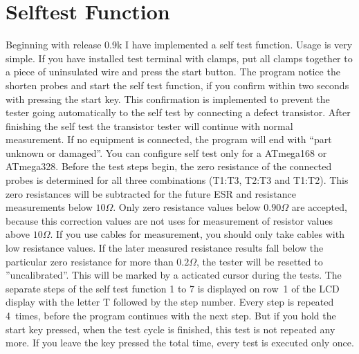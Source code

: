
\section{Selftest Function}
\label{sec:selftest}
Beginning with release 0.9k I have implemented a self test function. Usage is very simple.
If you have installed  test terminal with clamps, put all clamps together to a piece of uninsulated wire and press the start button.
The program notice the shorten probes and start the self test function, if you confirm within two
seconds with pressing the start key. This confirmation is implemented to prevent the tester
going automatically to the self test by connecting a defect transistor.
After finishing the self test the transistor tester will continue with normal measurement.
If no equipment is connected, the program will end with ``part unknown or damaged''. 
You can configure self test only for a ATmega168  or ATmega328.
Before the test steps begin, the zero resistance of the connected probes is determined for all three combinations
(T1:T3, T2:T3 and T1:T2).
This zero resistances will be subtracted for the future ESR and resistance measurements below \(10\Omega\).
Only zero resistance values below \(0.90\Omega\) are accepted, because this correction values are not
uses for measurement of resistor values above \(10\Omega\).
If you use cables for measurement, you should only take cables with low resistance values.
If the later measured resistance results fall below the particular zero resistance for more than \(0.2\Omega\),
the tester will be resetted to ''uncalibrated''.
This will be marked by a acticated cursor during the tests.
The separate steps of the self test function 1 to 7 is displayed on row~1 of the LCD display with the letter T
followed by the step number.
Every step is repeated 4~times, before the program continues with the next step.
But if you hold the start key pressed, when the test cycle is finished, this test is not repeated any more.
If you leave the key pressed the total time, every test is executed only once.

